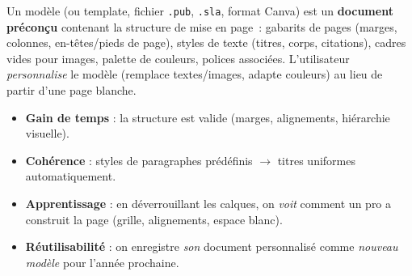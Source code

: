 \documentclass[11pt]{article}
\newcommand{\cle}[1]{{\popxbold\color{popdark}#1}}
\begin{document}
\begin{definition}
Un \cle{modèle} (ou \cle{template}, fichier \texttt{.pub}, \texttt{.sla}, format Canva) est un \textbf{document préconçu} contenant la structure de mise en page~: gabarits de pages (marges, colonnes, en-têtes/pieds de page), styles de texte (titres, corps, citations), cadres vides pour images, palette de couleurs, polices associées. L'utilisateur \emph{personnalise} le modèle (remplace textes/images, adapte couleurs) au lieu de partir d'une page blanche.
\end{definition}

\begin{propriete}
\begin{itemize}
    \item \textbf{Gain de temps} : la structure est valide (marges, alignements, hiérarchie visuelle).
    \item \textbf{Cohérence} : styles de paragraphes prédéfinis $\rightarrow$ titres uniformes automatiquement.
    \item \textbf{Apprentissage} : en déverrouillant les calques, on \emph{voit} comment un pro a construit la page (grille, alignements, espace blanc).
    \item \textbf{Réutilisabilité} : on enregistre \emph{son} document personnalisé comme \emph{nouveau modèle} pour l'année prochaine.
\end{itemize}
\end{propriete}
\end{document}
